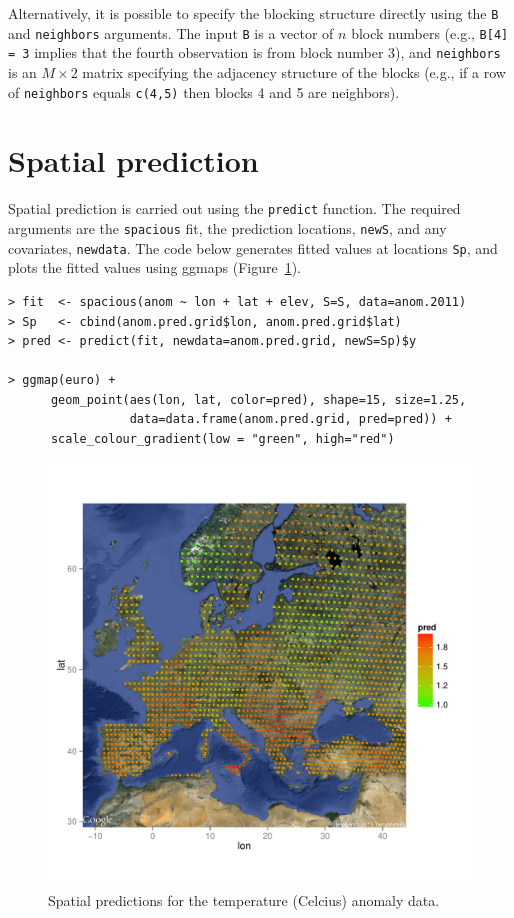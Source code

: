 \documentclass[11pt]{article}
\begin{document}
Alternatively, it is possible to specify the blocking structure directly using the {\tt B} and {\tt neighbors} arguments.
The input {\tt B} is a vector of $n$ block numbers (e.g., {\tt B[4] = 3} implies that the fourth observation is from block number 3), and {\tt neighbors} is an $M\times 2$ matrix specifying the adjacency structure of the blocks (e.g., if a row of {\tt neighbors} equals {\tt c(4,5)} then blocks 4 and 5 are neighbors).

\section{Spatial prediction}\label{s:predict}

Spatial prediction is carried out using the {\tt predict} function.
The required arguments are the {\tt spacious} fit, the prediction locations, {\tt newS}, and any covariates, {\tt newdata}.
The code below generates fitted values at locations {\tt Sp}, and plots the fitted values using ggmaps (Figure~\ref{f:pred}).

\begin{verbatim}
> fit  <- spacious(anom ~ lon + lat + elev, S=S, data=anom.2011)
> Sp   <- cbind(anom.pred.grid$lon, anom.pred.grid$lat)
> pred <- predict(fit, newdata=anom.pred.grid, newS=Sp)$y

> ggmap(euro) +
      geom_point(aes(lon, lat, color=pred), shape=15, size=1.25,
                 data=data.frame(anom.pred.grid, pred=pred)) +
      scale_colour_gradient(low = "green", high="red")
\end{verbatim}

\begin{figure}
	\caption{Spatial predictions for the temperature (Celcius) anomaly data.}\label{f:pred}
	\centering
	\includegraphics[width=6in]{figures/pred.pdf}
\end{figure}
\end{document}

